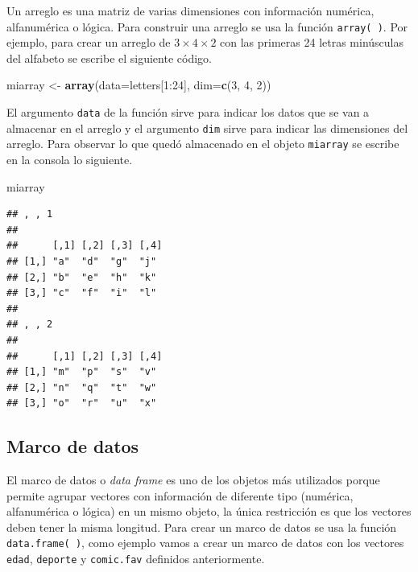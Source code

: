 \documentclass[10pt,]{krantz}
\makeatletter
\newenvironment{Shaded}{\begin{snugshade}}{\end{snugshade}}
\newcommand{\KeywordTok}[1]{\textcolor[rgb]{0.13,0.29,0.53}{\textbf{{#1}}}}
\newcommand{\DataTypeTok}[1]{\textcolor[rgb]{0.13,0.29,0.53}{{#1}}}
\newcommand{\DecValTok}[1]{\textcolor[rgb]{0.00,0.00,0.81}{{#1}}}
\newcommand{\StringTok}[1]{\textcolor[rgb]{0.31,0.60,0.02}{{#1}}}
\newcommand{\NormalTok}[1]{{#1}}
\newenvironment{kframe}{%
\medskip{}
\setlength{\fboxsep}{.8em}
 \def\at@end@of@kframe{}%
 \ifinner\ifhmode%
  \def\at@end@of@kframe{\end{minipage}}%
  \begin{minipage}{\columnwidth}%
 \fi\fi%
 \def\FrameCommand##1{\hskip\@totalleftmargin \hskip-\fboxsep
 \colorbox{shadecolor}{##1}\hskip-\fboxsep
     \hskip-\linewidth \hskip-\@totalleftmargin \hskip\columnwidth}%
 \MakeFramed {\advance\hsize-\width
   \@totalleftmargin\z@ \linewidth\hsize
   \@setminipage}}%
 {\par\unskip\endMakeFramed%
 \at@end@of@kframe}
\renewenvironment{Shaded}{\begin{kframe}}{\end{kframe}}
\makeatother
\begin{document}
Un arreglo  es una matriz de varias dimensiones con
información numérica, alfanumérica o lógica. Para construir una arreglo
se usa la función \texttt{array(\ )}. Por ejemplo, para crear un arreglo
de \(3 \times 4 \times 2\) con las primeras 24 letras minúsculas del
alfabeto se escribe el siguiente código.

\begin{Shaded}
\begin{Highlighting}[]
\NormalTok{miarray <-}\StringTok{ }\KeywordTok{array}\NormalTok{(}\DataTypeTok{data=}\NormalTok{letters[}\DecValTok{1}\NormalTok{:}\DecValTok{24}\NormalTok{], }\DataTypeTok{dim=}\KeywordTok{c}\NormalTok{(}\DecValTok{3}\NormalTok{, }\DecValTok{4}\NormalTok{, }\DecValTok{2}\NormalTok{))}
\end{Highlighting}
\end{Shaded}

El argumento \texttt{data} de la función sirve para indicar los datos
que se van a almacenar en el arreglo y el argumento \texttt{dim} sirve
para indicar las dimensiones del arreglo. Para observar lo que quedó
almacenado en el objeto \texttt{miarray} se escribe en la consola lo
siguiente.

\begin{Shaded}
\begin{Highlighting}[]
\NormalTok{miarray}
\end{Highlighting}
\end{Shaded}

\begin{verbatim}
## , , 1
## 
##      [,1] [,2] [,3] [,4]
## [1,] "a"  "d"  "g"  "j" 
## [2,] "b"  "e"  "h"  "k" 
## [3,] "c"  "f"  "i"  "l" 
## 
## , , 2
## 
##      [,1] [,2] [,3] [,4]
## [1,] "m"  "p"  "s"  "v" 
## [2,] "n"  "q"  "t"  "w" 
## [3,] "o"  "r"  "u"  "x"
\end{verbatim}

\subsection{Marco de datos}

El marco de datos  o \textit{data frame} es uno de
los objetos más utilizados porque permite agrupar vectores con
información de diferente tipo (numérica, alfanumérica o lógica) en un
mismo objeto, la única restricción es que los vectores deben tener la
misma longitud. Para crear un marco de datos se usa la función
\texttt{data.frame(\ )}, como ejemplo vamos a crear un marco de datos
con los vectores \texttt{edad}, \texttt{deporte} y \texttt{comic.fav}
definidos anteriormente.
\end{document}
